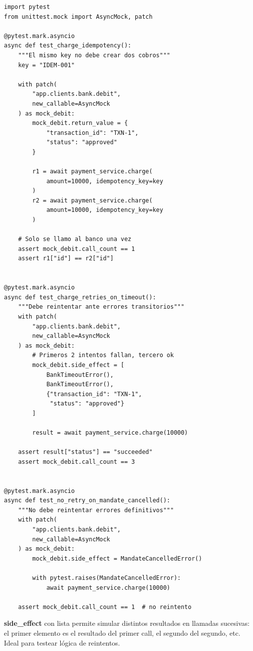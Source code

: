 \documentclass[11pt,a4paper]{article}
\begin{document}
\begin{pybox}
\begin{lstlisting}[style=python]
import pytest
from unittest.mock import AsyncMock, patch

@pytest.mark.asyncio
async def test_charge_idempotency():
    """El mismo key no debe crear dos cobros"""
    key = "IDEM-001"

    with patch(
        "app.clients.bank.debit",
        new_callable=AsyncMock
    ) as mock_debit:
        mock_debit.return_value = {
            "transaction_id": "TXN-1",
            "status": "approved"
        }

        r1 = await payment_service.charge(
            amount=10000, idempotency_key=key
        )
        r2 = await payment_service.charge(
            amount=10000, idempotency_key=key
        )

    # Solo se llamo al banco una vez
    assert mock_debit.call_count == 1
    assert r1["id"] == r2["id"]


@pytest.mark.asyncio
async def test_charge_retries_on_timeout():
    """Debe reintentar ante errores transitorios"""
    with patch(
        "app.clients.bank.debit",
        new_callable=AsyncMock
    ) as mock_debit:
        # Primeros 2 intentos fallan, tercero ok
        mock_debit.side_effect = [
            BankTimeoutError(),
            BankTimeoutError(),
            {"transaction_id": "TXN-1",
             "status": "approved"}
        ]

        result = await payment_service.charge(10000)

    assert result["status"] == "succeeded"
    assert mock_debit.call_count == 3


@pytest.mark.asyncio
async def test_no_retry_on_mandate_cancelled():
    """No debe reintentar errores definitivos"""
    with patch(
        "app.clients.bank.debit",
        new_callable=AsyncMock
    ) as mock_debit:
        mock_debit.side_effect = MandateCancelledError()

        with pytest.raises(MandateCancelledError):
            await payment_service.charge(10000)

    assert mock_debit.call_count == 1  # no reintento
\end{lstlisting}
\end{pybox}

\begin{tipbox}
\textbf{side\_effect} con lista permite simular distintos resultados en llamadas
sucesivas: el primer elemento es el resultado del primer call, el segundo del
segundo, etc. Ideal para testear lógica de reintentos.
\end{tipbox}
\end{document}
